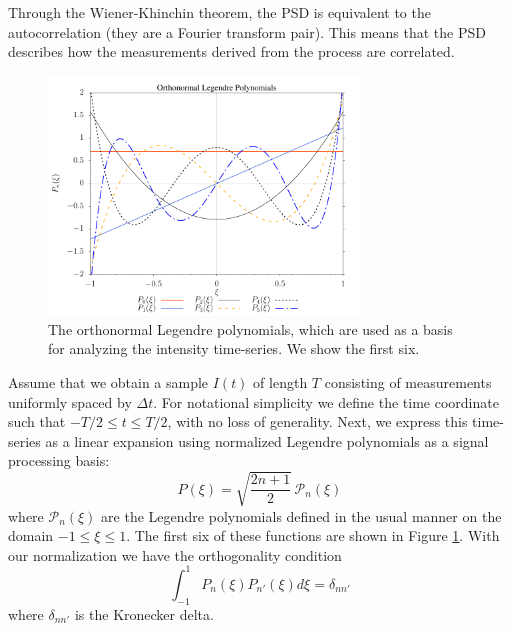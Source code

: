 \documentclass[11pt,preprint]{aastex}
\begin{document}
Through the Wiener-Khinchin theorem, the PSD is equivalent to the autocorrelation (they are a Fourier transform pair).  This means that the PSD describes how the measurements derived from the process are correlated. 

\begin{figure}[h]
\centering
\includegraphics[width=3.25in]{onLegPol.pdf}
\caption{The orthonormal Legendre polynomials, which are used as a basis for analyzing the intensity time-series.  We show the first six. \label{fig:onlegpol}}
\end{figure}

Assume that we obtain a sample $I(t)$ of length $T$ consisting of measurements uniformly spaced by $\Delta t$.  For notational simplicity we define the time coordinate such that $-T/2 \le t \le T/2$, with no loss of generality.  Next, we express this time-series as a linear expansion using normalized Legendre polynomials as a signal processing basis:
\begin{equation}
P(\xi) = \sqrt{\frac{2n+1}{2}}\, \mathscr{P}_n(\xi)
\label{eqn:basis}
\end{equation}
where $\mathscr{P}_n(\xi)$ are the Legendre polynomials defined in the usual manner \citep[cf.][]{Olver:2010:NHMF} on the domain $-1 \le \xi \le 1$. The first six of these functions are shown in Figure \ref{fig:onlegpol}.  With our normalization we have the orthogonality condition
\begin{equation}
\int_{-1}^{1}P_n(\xi)P_{n'}(\xi) d\xi = \delta_{nn'}
\label{eqn:orthonormal}
\end{equation}
where $\delta_{nn'}$ is the Kronecker delta. 
\end{document}
